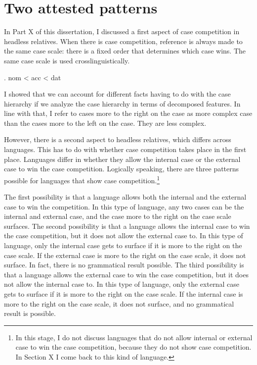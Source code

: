 
\chapter{Two attested patterns}

In Part X of this dissertation, I discussed a first aspect of case competition in headless relatives. When there is case competition, reference is always made to the same case scale: there is a fixed order that determines which case wins. The same case scale is used crosslinguistically.

\ex. \ac{nom} < \ac{acc} < \ac{dat}\label{ex:case-scale-two-patterns}

I showed that we can account for different facts having to do with the case hierarchy if we analyze the case hierarchy in terms of decomposed features. In line with that, I refer to cases more to the right on the case as more complex case than the cases more to the left on the case. They are less complex.

However, there is a second aspect to headless relatives, which differs across languages. This has to do with whether case competition takes place in the first place. Languages differ in whether they allow the internal case or the external case to win the case competition. Logically speaking, there are three patterns possible for languages that show case competition.\footnote{
In this stage, I do not discuss languages that do not allow internal or external case to win the case competition, because they do not show case competition. In Section X I come back to this kind of language.
}

The first possibility is that a language allows both the internal and the external case to win the competition. In this type of language, any two cases can be the internal and external case, and the case more to the right on the case scale surfaces.
The second possibility is that a language allows the internal case to win the case competition, but it does not allow the external case to. In this type of language, only the internal case gets to surface if it is more to the right on the case scale. If the external case is more to the right on the case scale, it does not surface. In fact, there is no grammatical result possible.
The third possibility is that a language allows the external case to win the case competition, but it does not allow the internal case to. In this type of language, only the external case gets to surface if it is more to the right on the case scale. If the internal case is more to the right on the case scale, it does not surface, and no grammatical result is possible.

